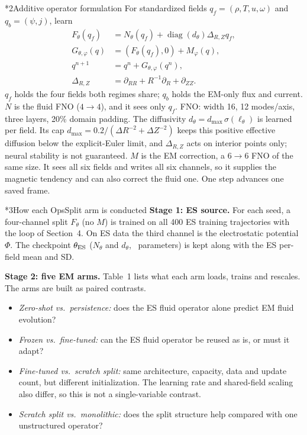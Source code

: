 \documentclass[10pt,letterpaper,twocolumn]{article}
\makeatletter
\renewcommand\section{\@startsection{section}{1}{0pt}{8pt}{4pt}{\normalfont\fontsize{11}{13}\bfseries}}
\makeatother
\begin{document}
\section*{2\quad Additive operator formulation}
For standardized fields $q_f=(\rho,T,u,\omega)$ and $q_b=(\psi,j)$, learn
\begin{equation*}
\begin{aligned}
F_\theta(q_f)&=N_\theta(q_f)+\operatorname{diag}(d_\theta)\Delta_{R,Z}q_f,\\
G_{\theta,\varphi}(q)&=(F_\theta(q_f),0)+M_\varphi(q),\\
q^{n+1}&=q^n+G_{\theta,\varphi}(q^n),\\
\Delta_{R,Z}&=\partial_{RR}+R^{-1}\partial_R+\partial_{ZZ}.
\end{aligned}
\end{equation*}
$q_f$ holds the four fields both regimes share; $q_b$ holds the EM-only flux and current.
$N$ is the fluid FNO ($4\!\to\!4$), and it sees only $q_f$.
FNO: width 16, 12 modes/axis, three layers, 20\% domain padding.
The diffusivity $d_\theta=d_{\max}\,\sigma(\ell_\theta)$ is learned per field.
Its cap $d_{\max}=0.2/(\Delta R^{-2}+\Delta Z^{-2})$ keeps this positive effective diffusion below the explicit-Euler limit, and $\Delta_{R,Z}$ acts on interior points only; neural stability is not guaranteed.
$M$ is the EM correction, a $6\!\to\!6$ FNO of the same size.
It sees all six fields and writes all six channels, so it supplies the magnetic tendency and can also correct the fluid one.
One step advances one saved frame.

\section*{3\quad How each OpsSplit arm is conducted}
\textbf{Stage 1: ES source.} For each seed, a four-channel split $F_\theta$ (no $M$) is trained on all 400 ES training
trajectories with the loop of Section~4. On ES data the third channel is the electrostatic potential $\Phi$.
The checkpoint $\theta_{\rm ES}$ ($N_\theta$ and $d_\theta$, \TrainSource\ parameters) is kept along with the ES per-field mean and SD.

\textbf{Stage 2: five EM arms.} Table~1 lists what each arm loads, trains and rescales.
The arms are built as paired contrasts.
\begin{itemize}[leftmargin=10pt,itemsep=1pt,topsep=2pt,parsep=0pt]
\item \emph{Zero-shot vs.\ persistence:} does the ES fluid operator alone predict EM fluid evolution?
\item \emph{Frozen vs.\ fine-tuned:} can the ES fluid operator be reused as is, or must it adapt?
\item \emph{Fine-tuned vs.\ scratch split:} same architecture, capacity, data and update count, but different initialization.
The learning rate and shared-field scaling also differ, so this is not a single-variable contrast.
\item \emph{Scratch split vs.\ monolithic:} does the split structure help compared with one unstructured operator?
\end{itemize}
\end{document}
